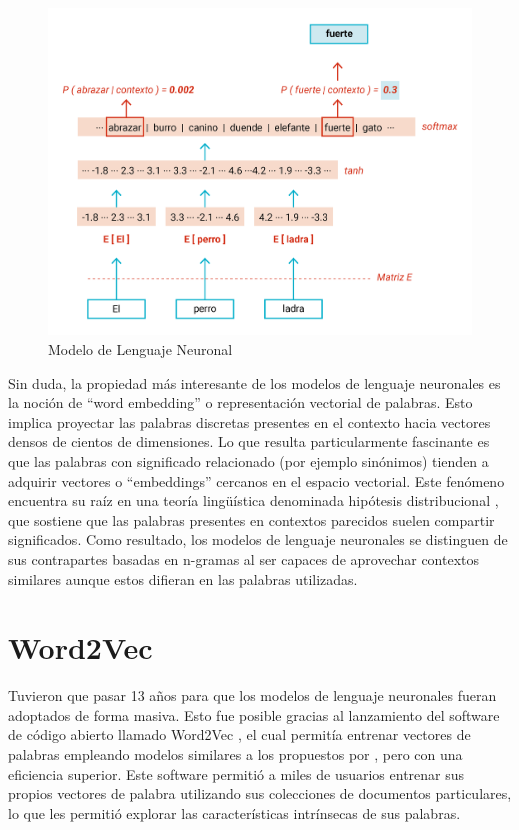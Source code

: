 \begin{figure}[htb]
\centering
\includegraphics[scale=0.6]{pics/LMneuronal.png}
\caption{Modelo de Lenguaje Neuronal}
\label{img_emb_neu}
\end{figure}



Sin duda, la propiedad más interesante de los modelos de lenguaje neuronales es la noción de ``word embedding'' o representación vectorial de palabras. Esto implica proyectar las palabras discretas presentes en el contexto hacia vectores densos de cientos de dimensiones. Lo que resulta particularmente fascinante es que las palabras con significado relacionado (por ejemplo sinónimos) tienden a adquirir vectores o ``embeddings'' cercanos en el espacio vectorial. Este fenómeno encuentra su raíz en una teoría lingüística denominada hipótesis distribucional \cite{harris1954,firth1957synopsis}, que sostiene que las palabras presentes en contextos parecidos suelen compartir significados. Como resultado, los modelos de lenguaje neuronales se distinguen de sus contrapartes basadas en n-gramas al ser capaces de aprovechar contextos similares aunque estos difieran en las palabras utilizadas.


\section{Word2Vec}
Tuvieron que pasar 13 años para que los modelos de lenguaje neuronales fueran adoptados de forma masiva. Esto fue posible gracias al lanzamiento del software de código abierto llamado Word2Vec \cite{Mikolov2013}, el cual permitía entrenar vectores de palabras empleando modelos similares a los propuestos por \cite{bengio2000neural}, pero con una eficiencia superior. Este software permitió a miles de usuarios entrenar sus propios vectores de palabra utilizando sus colecciones de documentos particulares, lo que les permitió explorar las características intrínsecas de sus palabras.


